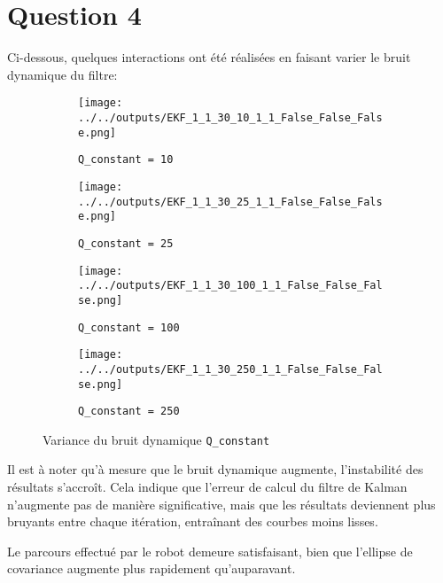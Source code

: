 \documentclass[../CSC_5RO12_TA_TP2.tex]{subfiles}
\begin{document}
\section{Question 4}
\noindent Ci-dessous, quelques interactions ont été réalisées en faisant varier le bruit dynamique du filtre:
\begin{figure}[H]
    \centering
    \begin{subfigure}[b]{0.475\textwidth}
        \centering
        \texttt{[image: ../../outputs/EKF\_1\_1\_30\_10\_1\_1\_False\_False\_False.png]}
        \caption{\texttt{Q\_constant = 10}}
        \label{}
    \end{subfigure}\hfill
    \begin{subfigure}[b]{0.475\textwidth}
        \centering
        \texttt{[image: ../../outputs/EKF\_1\_1\_30\_25\_1\_1\_False\_False\_False.png]}
        \caption{\texttt{Q\_constant = 25}}
        \label{}
    \end{subfigure}
    \begin{subfigure}[b]{0.475\textwidth}
        \centering
        \texttt{[image: ../../outputs/EKF\_1\_1\_30\_100\_1\_1\_False\_False\_False.png]}
        \caption{\texttt{Q\_constant = 100}}
        \label{}
    \end{subfigure}\hfill
    \begin{subfigure}[b]{0.475\textwidth}
        \centering
        \texttt{[image: ../../outputs/EKF\_1\_1\_30\_250\_1\_1\_False\_False\_False.png]}
        \caption{\texttt{Q\_constant = 250}}
        \label{}
    \end{subfigure}
    \caption{Variance du bruit dynamique \texttt{Q\_constant}}
    \label{}
\end{figure}
\noindent Il est à noter qu'à mesure que le bruit dynamique augmente, l'instabilité des résultats s'accroît. Cela indique que l'erreur de calcul du filtre de Kalman n'augmente pas de manière significative, mais que les résultats deviennent plus bruyants entre chaque itération, entraînant des courbes moins lisses.\\
\begin{remark}
    Le parcours effectué par le robot demeure satisfaisant, bien que l'ellipse de covariance augmente plus rapidement qu'auparavant.
\end{remark}
\end{document}
